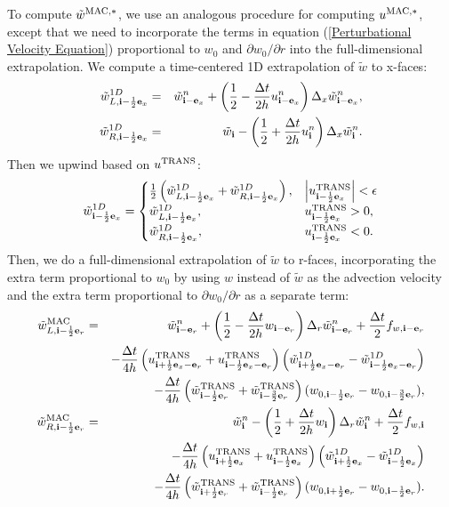 \documentclass[11pt]{article}
\def\half  {\frac{1}{2}}
\def\dt    {\Delta t}
\def\mac   {\rm MAC}
\def\trans {\rm TRANS}
\def\eb    {{\bf e}}
\def\ib    {{\bf i}}
\def\wt    {\tilde{w}}
\begin{document}
To compute $\wt^{\mac,*}$, we use an analogous procedure for computing $u^{\mac,*}$, except that we need to incorporate the terms in equation (\ref{Perturbational Velocity Equation}) proportional to $w_0$ and $\partial w_0/\partial r$ into the full-dimensional extrapolation.  We compute a time-centered 1D extrapolation of $\wt$ to x-faces:
\begin{eqnarray}
\wt_{L,\ib-\half\eb_x}^{1D} &=& \wt_{\ib-\eb_x}^n + \left(\half - \frac{\dt}{2h}u_{\ib-\eb_x}^n\right)\Delta_x \wt_{\ib-\eb_x}^n, \\
\wt_{R,\ib-\half\eb_x}^{1D} &=& \wt_{\ib} - \left(\half + \frac{\dt}{2h}u_{\ib}^n\right)\Delta_x \wt_{\ib}^n.
\end{eqnarray}
Then we upwind based on $u^{\trans}$:
\begin{equation}
\wt_{\ib-\half\eb_x}^{1D} =
\begin{cases}
\half\left(\wt_{L,\ib-\half\eb_x}^{1D} + \wt_{R,\ib-\half\eb_x}^{1D}\right), & \left|u^{\trans}_{\ib-\half\eb_x}\right| < \epsilon \\
\wt_{L,\ib-\half\eb_x}^{1D}, & u^{\trans}_{\ib-\half\eb_x} > 0, \\
\wt_{R,\ib-\half\eb_x}^{1D}, & u^{\trans}_{\ib-\half\eb_x} < 0. \\
\end{cases}
\end{equation}
Then, we do a full-dimensional extrapolation of $\wt$ to r-faces, incorporating the extra term proportional to $w_0$ by using $w$ instead of $\wt$ as the advection velocity and the extra term proportional to $\partial w_0/\partial r$ as a separate term:
\begin{eqnarray}
\wt_{L,\ib-\half\eb_r}^{\mac} &=& \wt_{\ib-\eb_r}^n + \left(\half - \frac{\dt}{2h}w_{\ib-\eb_r}\right)\Delta_r \wt_{\ib-\eb_r}^n + \frac{\dt}{2}f_{w,\ib-\eb_r} \nonumber \\
&& - \frac{\dt}{4h}\left(u_{\ib+\half\eb_x-\eb_r}^{\trans}+u_{\ib-\half\eb_x-\eb_r}^{\trans}\right)\left(\wt_{\ib+\half\eb_x-\eb_r}^{1D} - \wt_{\ib-\half\eb_x-\eb_r}^{1D}\right) \nonumber \\
&& - \frac{\dt}{4h}\left(\wt_{\ib-\half\eb_r}^{\trans}+\wt_{\ib-\frac{3}{2}\eb_r}^{\trans}\right)(w_{0,\ib-\half\eb_r} - w_{0,\ib-\frac{3}{2}\eb_r}),\label{wt_L Extrapolation} \\
\wt_{R,\ib-\half\eb_r}^{\mac} &=& \wt_{\ib}^n - \left(\half + \frac{\dt}{2h}w_{\ib}\right)\Delta_r \wt_{\ib}^n + \frac{\dt}{2}f_{w,\ib} \nonumber \\
&& - \frac{\dt}{4h}\left(u_{\ib+\half\eb_x}^{\trans}+u_{\ib-\half\eb_x}^{\trans}\right)\left(\wt_{\ib+\half\eb_x}^{1D} - \wt_{\ib-\half\eb_x}^{1D}\right) \nonumber \\
&& - \frac{\dt}{4h}\left(\wt_{\ib+\half\eb_r}^{\trans}+\wt_{\ib-\half\eb_r}^{\trans}\right)(w_{0,\ib+\half\eb_r} - w_{0,\ib-\half\eb_r}).\label{wt_R Extrapolation}
\end{eqnarray}
\end{document}

